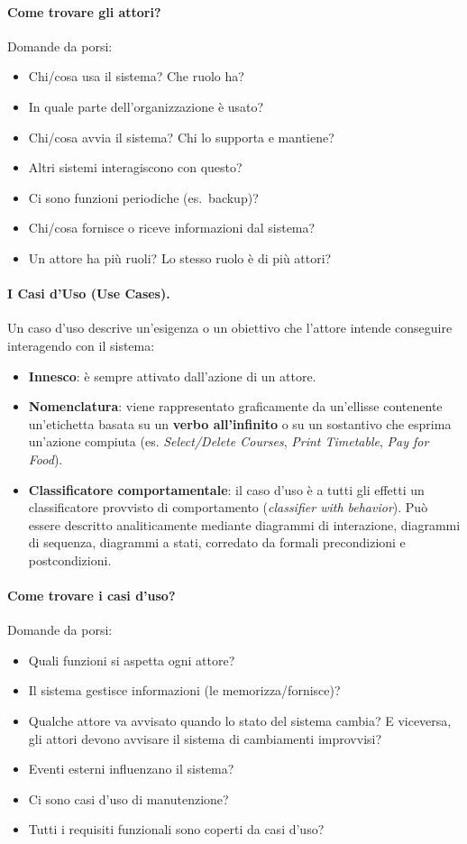 \documentclass[12pt]{extarticle}
\begin{document}
\paragraph{Come trovare gli attori?} Domande da porsi:
\begin{itemize}
    \item Chi/cosa usa il sistema? Che ruolo ha?
    \item In quale parte dell'organizzazione è usato?
    \item Chi/cosa avvia il sistema? Chi lo supporta e mantiene?
    \item Altri sistemi interagiscono con questo?
    \item Ci sono funzioni periodiche (es.\ backup)?
    \item Chi/cosa fornisce o riceve informazioni dal sistema?
    \item Un attore ha più ruoli? Lo stesso ruolo è di più attori?
\end{itemize}


\paragraph{I Casi d'Uso (Use Cases).}
Un caso d'uso descrive un'esigenza o un obiettivo che l'attore intende conseguire interagendo con il sistema:
\begin{itemize}
    \item \textbf{Innesco}: è sempre attivato dall'azione di un attore.
    \item \textbf{Nomenclatura}: viene rappresentato graficamente da un'ellisse contenente un'etichetta basata su un \textbf{verbo all'infinito} o su un sostantivo che esprima un'azione compiuta (es. \textit{Select/Delete Courses}, \textit{Print Timetable}, \textit{Pay for Food}).
    \item \textbf{Classificatore comportamentale}: il caso d'uso è a tutti gli effetti un classificatore provvisto di comportamento (\textit{classifier with behavior}). Può essere descritto analiticamente mediante diagrammi di interazione, diagrammi di sequenza, diagrammi a stati, corredato da formali precondizioni e postcondizioni.
\end{itemize}


\paragraph{Come trovare i casi d'uso?} Domande da porsi:
\begin{itemize}
    \item Quali funzioni si aspetta ogni attore?
    \item Il sistema gestisce informazioni (le memorizza/fornisce)?
    \item Qualche attore va avvisato quando lo stato del sistema cambia? E viceversa, gli attori devono avvisare il sistema di cambiamenti improvvisi?
    \item Eventi esterni influenzano il sistema?
    \item Ci sono casi d'uso di manutenzione?
    \item Tutti i requisiti funzionali sono coperti da casi d'uso?
\end{itemize}
\end{document}
